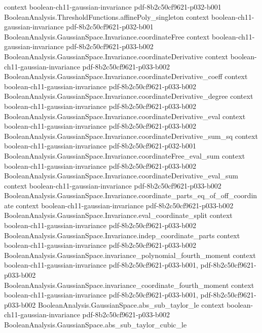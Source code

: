 \begin{theorem}
  {context}
  {boolean-ch11-gaussian-invariance}
  {pdf-8b2c50cf9621-p032-b001}
\proofstep
  {BooleanAnalysis.ThresholdFunctions.affinePoly_singleton}
  {context}
  {boolean-ch11-gaussian-invariance}
  {pdf-8b2c50cf9621-p032-b001}
\proofstep
  {BooleanAnalysis.GaussianSpace.Invariance.coordinateFree}
  {context}
  {boolean-ch11-gaussian-invariance}
  {pdf-8b2c50cf9621-p033-b002}
\proofstep
  {BooleanAnalysis.GaussianSpace.Invariance.coordinateDerivative}
  {context}
  {boolean-ch11-gaussian-invariance}
  {pdf-8b2c50cf9621-p033-b002}
\proofstep
  {BooleanAnalysis.GaussianSpace.Invariance.coordinateDerivative_coeff}
  {context}
  {boolean-ch11-gaussian-invariance}
  {pdf-8b2c50cf9621-p033-b002}
\proofstep
  {BooleanAnalysis.GaussianSpace.Invariance.coordinateDerivative_degree}
  {context}
  {boolean-ch11-gaussian-invariance}
  {pdf-8b2c50cf9621-p033-b002}
\proofstep
  {BooleanAnalysis.GaussianSpace.Invariance.coordinateDerivative_eval}
  {context}
  {boolean-ch11-gaussian-invariance}
  {pdf-8b2c50cf9621-p033-b002}
\proofstep
  {BooleanAnalysis.GaussianSpace.Invariance.coordinateDerivative_sum_sq}
  {context}
  {boolean-ch11-gaussian-invariance}
  {pdf-8b2c50cf9621-p032-b001}
\proofstep
  {BooleanAnalysis.GaussianSpace.Invariance.coordinateFree_eval_sum}
  {context}
  {boolean-ch11-gaussian-invariance}
  {pdf-8b2c50cf9621-p033-b002}
\proofstep
  {BooleanAnalysis.GaussianSpace.Invariance.coordinateDerivative_eval_sum}
  {context}
  {boolean-ch11-gaussian-invariance}
  {pdf-8b2c50cf9621-p033-b002}
\proofstep
  {BooleanAnalysis.GaussianSpace.Invariance.coordinate_parts_eq_of_off_coordinate}
  {context}
  {boolean-ch11-gaussian-invariance}
  {pdf-8b2c50cf9621-p033-b002}
\proofstep
  {BooleanAnalysis.GaussianSpace.Invariance.eval_coordinate_split}
  {context}
  {boolean-ch11-gaussian-invariance}
  {pdf-8b2c50cf9621-p033-b002}
\proofstep
  {BooleanAnalysis.GaussianSpace.Invariance.indep_coordinate_parts}
  {context}
  {boolean-ch11-gaussian-invariance}
  {pdf-8b2c50cf9621-p033-b002}
\proofstep
  {BooleanAnalysis.GaussianSpace.invariance_polynomial_fourth_moment}
  {context}
  {boolean-ch11-gaussian-invariance}
  {pdf-8b2c50cf9621-p033-b001,
    pdf-8b2c50cf9621-p033-b002}
\proofstep
  {BooleanAnalysis.GaussianSpace.invariance_coordinate_fourth_moment}
  {context}
  {boolean-ch11-gaussian-invariance}
  {pdf-8b2c50cf9621-p033-b001,
    pdf-8b2c50cf9621-p033-b002}
\proofstep
  {BooleanAnalysis.GaussianSpace.abs_sub_taylor_le}
  {context}
  {boolean-ch11-gaussian-invariance}
  {pdf-8b2c50cf9621-p033-b002}
\proofstep
  {BooleanAnalysis.GaussianSpace.abs_sub_taylor_cubic_le}

\end{theorem}
